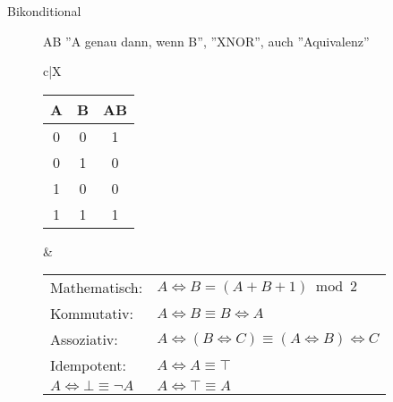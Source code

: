 \documentclass[12pt,a4paper]{article}
\begin{document}
\begin{description}
\begin{description}
			\item[Bikonditional] A\Leftrightarrow B ''A genau dann, wenn B'', ''XNOR'', auch ''Aquivalenz'' \equiv \\
				\begin{tabularx}{\linewidth}{c|X}
					\begin{tabular}[t]{c | c || c}
						A & B & A\Leftrightarrow B \\ \hline\hline
						0 & 0 & 1 \\ \hline
						0 & 1 & 0 \\ \hline
						1 & 0 & 0 \\ \hline
						1 & 1 & 1
					\end{tabular} &
					\begin{tabular}[t]{ll}
						Mathematisch: & $A \Leftrightarrow B = (A + B + 1)\bmod 2$ \\
						Kommutativ: & $A \Leftrightarrow B \equiv B \Leftrightarrow A$ \\
						Assoziativ: & $A \Leftrightarrow (B \Leftrightarrow C) \equiv (A \Leftrightarrow B) \Leftrightarrow C$ \\
						\neg Idempotent: & $A \Leftrightarrow A \equiv \top$ \\
						$A \Leftrightarrow \bot \equiv \neg A$ & $A \Leftrightarrow \top \equiv A$
					\end{tabular} \\ \hline
				\end{tabularx}
		\end{description}	
\end{description}
\end{document}
